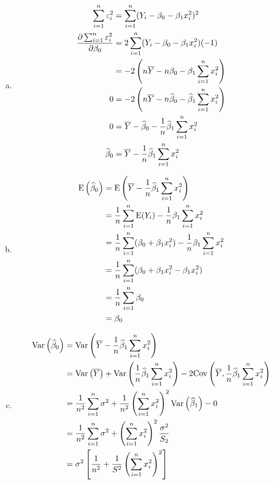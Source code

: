 \documentclass[letter, 11pt]{article}
\begin{document}
\begin{enumerate}[(a)]
    \item 
        \begin{align*}
            \sum_{i=1}^n \varepsilon_i^2 
            &= \sum_{i=1}^n (Y_i - \beta_0 - \beta_1 x_i^2)^2\cr
            \frac{\partial \sum_{i=1}^n \varepsilon_i^2 }{\partial \beta_0} 
            &= 2 \sum_{i=1}^n (Y_i - \beta_0 - \beta_1 x_i^2)(-1) \cr
            &= -2 \left(n \overline{Y} - n\beta_0 - \beta_1 \sum_{i=1}^n x_i^2 \right) \cr
            0 
            &= -2 \left(n \overline{Y} - n\widehat{\beta}_0 - \widehat{\beta}_1 \sum_{i=1}^n x_i^2 \right) \cr
            0 
            &=    \overline{Y} - \widehat{\beta}_0 - \frac{1}{n}\widehat{\beta}_1 \sum_{i=1}^n x_i^2 \cr
            \widehat{\beta}_0
            &=    \overline{Y} - \frac{1}{n}\widehat{\beta}_1 \sum_{i=1}^n x_i^2 \cr
        \end{align*}
    \item  
        \begin{align*}
            \mathrm{E}\left( \widehat{\beta}_0\right) 
            &=  \mathrm{E}\left( \overline{Y} - \frac{1}{n}\widehat{\beta}_1 \sum_{i=1}^n x_i^2  \right) \cr
            &= \frac{1}{n} \sum_{i=1}^n \mathrm{E}(Y_i) - \frac{1}{n}\beta_1 \sum_{i=1}^n x_i^2 \cr
            &= \frac{1}{n} \sum_{i=1}^n (\beta_0 + \beta_1 x_i^2) - \frac{1}{n}\beta_1 \sum_{i=1}^n x_i^2 \cr
            &= \frac{1}{n} \sum_{i=1}^n (\beta_0 + \beta_1 x_i^2 - \beta_1  x_i^2 ) \cr
            &= \frac{1}{n} \sum_{i=1}^n \beta_0 \cr
            &= \beta_0
        \end{align*}
    \item 
        \begin{align*}
            \mathrm{Var}\left( \widehat{\beta}_0\right) 
            &=  \mathrm{Var}\left( \overline{Y} - \frac{1}{n}\widehat{\beta}_1 \sum_{i=1}^n x_i^2  \right) \cr
            &=  \mathrm{Var}\left( \overline{Y} \right) +  \mathrm{Var}\left( \frac{1}{n}\widehat{\beta}_1 \sum_{i=1}^n x_i^2  \right) - 2 \mathrm{Cov}\left( \overline{Y},  \frac{1}{n}\widehat{\beta}_1 \sum_{i=1}^n x_i^2  \right) \cr
            &= \frac{1}{n^2}\sum_{i=1}^n \sigma^2 + \frac{1}{n^2} \left( \sum_{i=1}^n x_i^2  \right) ^2 \mathrm{Var}\left( \widehat{\beta}_1\right) - 0 \cr
            &= \frac{1}{n^2}\sum_{i=1}^n \sigma^2 + \left( \sum_{i=1}^n x_i^2  \right) ^2 \frac{\sigma^2}{S_2} \cr
            &= \sigma^2\left[ \frac{1}{n^2} + \frac{1}{S^2} \left( \sum_{i=1}^n x_i^2  \right) ^2 \right]
        \end{align*}
\end{enumerate}
\end{document}
